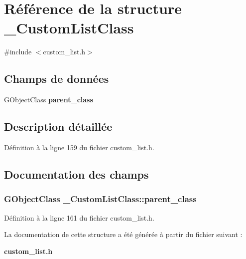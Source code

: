 \section{Référence de la structure \_\-CustomListClass}
\label{struct__CustomListClass}


{\ttfamily \#include $<$custom\_\-list.h$>$}

\subsection*{Champs de données}
\begin{DoxyCompactItemize}
\item 
GObjectClass {\bf parent\_\-class}
\end{DoxyCompactItemize}


\subsection{Description détaillée}


Définition à la ligne 159 du fichier custom\_\-list.h.



\subsection{Documentation des champs}
\subsubsection[{parent\_\-class}]{\setlength{\rightskip}{0pt plus 5cm}GObjectClass {\bf \_\-CustomListClass::parent\_\-class}}\label{struct__CustomListClass_a9067eafbe6649ba626032b65f5d34997}


Définition à la ligne 161 du fichier custom\_\-list.h.



La documentation de cette structure a été générée à partir du fichier suivant :\begin{DoxyCompactItemize}
\item 
{\bf custom\_\-list.h}\end{DoxyCompactItemize}
